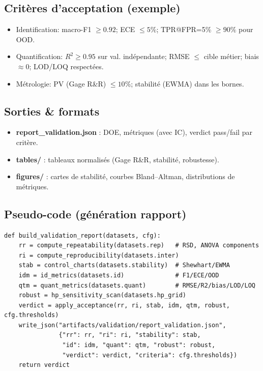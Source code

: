 \subsection{Critères d'acceptation (exemple)}
\begin{itemize}[nosep]
\item Identification: macro-F1 $\ge 0.92$; ECE $\le 5\%$; TPR@FPR=5\% $\ge 90\%$ pour OOD.
\item Quantification: $R^2 \ge 0.95$ sur val. indépendante; RMSE $\le$ cible métier; biais $\approx 0$; LOD/LOQ respectées.
\item Métrologie: PV (Gage R\&R) $\le 10\%$; stabilité (EWMA) dans les bornes.
\end{itemize}

\subsection{Sorties \& formats}
\begin{itemize}[nosep]
\item \textbf{report\_validation.json} : DOE, métriques (avec IC), verdict pass/fail par critère.
\item \textbf{tables/} : tableaux normalisés (Gage R\&R, stabilité, robustesse).
\item \textbf{figures/} : cartes de stabilité, courbes Bland--Altman, distributions de métriques.
\end{itemize}

\subsection{Pseudo-code (génération rapport)}
\begin{lstlisting}[basicstyle=\ttfamily\small]
def build_validation_report(datasets, cfg):
    rr = compute_repeatability(datasets.rep)   # RSD, ANOVA components
    ri = compute_reproducibility(datasets.inter)
    stab = control_charts(datasets.stability)  # Shewhart/EWMA
    idm = id_metrics(datasets.id)              # F1/ECE/OOD
    qtm = quant_metrics(datasets.quant)        # RMSE/R2/bias/LOD/LOQ
    robust = hp_sensitivity_scan(datasets.hp_grid)
    verdict = apply_acceptance(rr, ri, stab, idm, qtm, robust, cfg.thresholds)
    write_json("artifacts/validation/report_validation.json",
               {"rr": rr, "ri": ri, "stability": stab,
                "id": idm, "quant": qtm, "robust": robust,
                "verdict": verdict, "criteria": cfg.thresholds})
    return verdict
\end{lstlisting}

